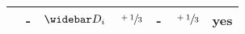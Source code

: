 \documentclass[../main.tex]{subfiles}
\begin{document}
{\begin{table}[ht!]
\begin{tabular}{|l|c|c|c|c|c|c|}
                                             & -                                & \(\wbar{D}_i\)    & \(\sfrac{+1}{3}\) & -                       & \(\sfrac{+1}{3}\) & yes \\
    \hline
  \end{tabular}

\end{table}}
\end{document}
